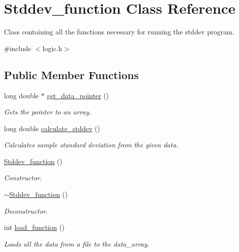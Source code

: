 \hypertarget{class_stddev__function}{}\section{Stddev\+\_\+function Class Reference}
\label{class_stddev__function}


Class containing all the functions necessary for running the stddev program.  




{\ttfamily \#include $<$logic.\+h$>$}

\subsection*{Public Member Functions}
\begin{DoxyCompactItemize}
\item 
long double $\ast$ \mbox{\hyperlink{class_stddev__function_ae02f118647d6a8a8d213856a0d0dbef4}{get\+\_\+data\+\_\+pointer}} ()
\begin{DoxyCompactList}\small\item\em Gets the pointer to an array. \end{DoxyCompactList}\item 
long double \mbox{\hyperlink{class_stddev__function_a99d48dedf85d9b9a35962114be1b3d48}{calculate\+\_\+stddev}} ()
\begin{DoxyCompactList}\small\item\em Calculates sample standard deviation from the given data. \end{DoxyCompactList}\item 
\mbox{\hyperlink{class_stddev__function_a7a3859ed9a1076997f3520f94963cb4e}{Stddev\+\_\+function}} ()
\begin{DoxyCompactList}\small\item\em Constructor. \end{DoxyCompactList}\item 
\mbox{\hyperlink{class_stddev__function_a0bc75b3f42e65658dbf77be939cbf5d1}{$\sim$\+Stddev\+\_\+function}} ()
\begin{DoxyCompactList}\small\item\em Deconstructor. \end{DoxyCompactList}\item 
int \mbox{\hyperlink{class_stddev__function_adbcb1c4380ea74e87448dd77ebbf046f}{load\+\_\+function}} ()
\begin{DoxyCompactList}\small\item\em Loads all the data from a file to the data\+\_\+array. \end{DoxyCompactList}\end{DoxyCompactItemize}


